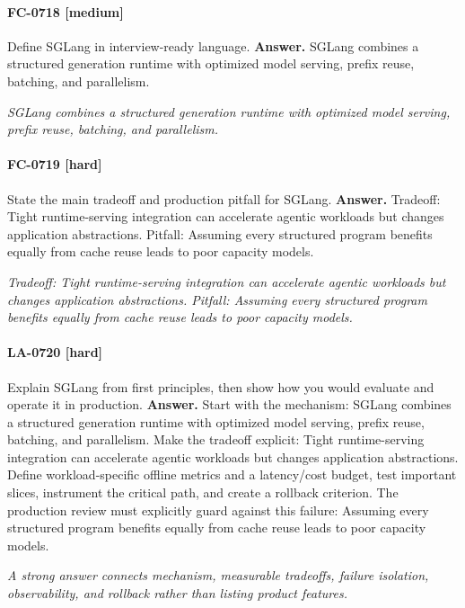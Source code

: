 \paragraph{FC-0718 [medium]} Define SGLang in interview-ready language.
\noindent\textbf{Answer.} SGLang combines a structured generation runtime with optimized model serving, prefix reuse, batching, and parallelism.
\par\textit{SGLang combines a structured generation runtime with optimized model serving, prefix reuse, batching, and parallelism.}
\paragraph{FC-0719 [hard]} State the main tradeoff and production pitfall for SGLang.
\noindent\textbf{Answer.} Tradeoff: Tight runtime-serving integration can accelerate agentic workloads but changes application abstractions. Pitfall: Assuming every structured program benefits equally from cache reuse leads to poor capacity models.
\par\textit{Tradeoff: Tight runtime-serving integration can accelerate agentic workloads but changes application abstractions. Pitfall: Assuming every structured program benefits equally from cache reuse leads to poor capacity models.}
\paragraph{LA-0720 [hard]} Explain SGLang from first principles, then show how you would evaluate and operate it in production.
\noindent\textbf{Answer.} Start with the mechanism: SGLang combines a structured generation runtime with optimized model serving, prefix reuse, batching, and parallelism. Make the tradeoff explicit: Tight runtime-serving integration can accelerate agentic workloads but changes application abstractions. Define workload-specific offline metrics and a latency/cost budget, test important slices, instrument the critical path, and create a rollback criterion. The production review must explicitly guard against this failure: Assuming every structured program benefits equally from cache reuse leads to poor capacity models.
\par\textit{A strong answer connects mechanism, measurable tradeoffs, failure isolation, observability, and rollback rather than listing product features.}
